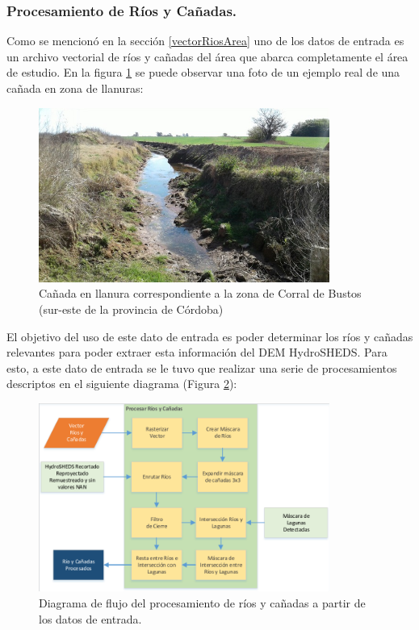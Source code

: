 \documentclass[10pt,a4paper, twoside]{report}
\begin{document}
\subsubsection{Procesamiento de Ríos y Cañadas.}

Como se mencionó en la sección \ref{vectorRiosArea} uno de los datos de entrada es un archivo vectorial de ríos y cañadas del área que abarca completamente el área de estudio. En la figura \ref{caniada} se puede observar una foto de un ejemplo real de una cañada en zona de llanuras:

\begin{figure}[H]
   \centering      
   \includegraphics[width=0.85\textwidth]{imagenes/caniada.jpg}
 \caption{Cañada en llanura correspondiente a la zona de Corral de Bustos (sur-este de la provincia de Córdoba)}
 \label{caniada}
\end{figure}

El objetivo del uso de este dato de entrada es poder determinar los ríos y cañadas relevantes para poder extraer esta información del DEM HydroSHEDS. Para esto, a este dato de entrada se le tuvo que realizar una serie de procesamientos descriptos en el siguiente diagrama (Figura \ref{DiagramaRios}):

\begin{figure}[H]
   \centering      
   \includegraphics[width=0.85\textwidth]{imagenes/DiagramaRios.pdf}
 \caption{Diagrama de flujo del procesamiento de ríos y cañadas a partir de los datos de entrada.}
 \label{DiagramaRios}
\end{figure}	
\end{document}
